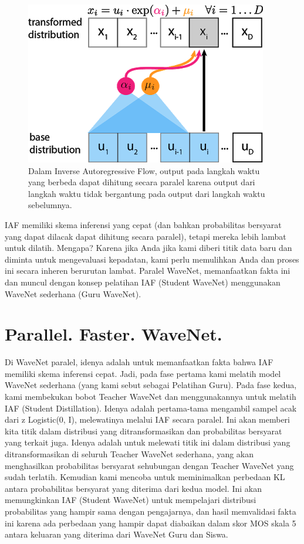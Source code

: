 \begin{figure}[H]
        \centerline{\includegraphics[scale=.5]{figures/rumus13}}
        \caption{Dalam Inverse Autoregressive Flow, output pada langkah waktu yang berbeda dapat dihitung secara paralel karena output dari langkah waktu tidak bergantung pada output dari langkah waktu sebelumnya.}
		\label{rumus13}
\end{figure}
IAF memiliki skema inferensi yang cepat (dan bahkan probabilitas bersyarat yang dapat dilacak dapat dihitung secara paralel), tetapi mereka lebih lambat untuk dilatih. Mengapa? Karena jika Anda jika kami diberi titik data baru dan diminta untuk mengevaluasi kepadatan, kami perlu memulihkan Anda dan proses ini secara inheren berurutan lambat. Paralel WaveNet, memanfaatkan fakta ini dan muncul dengan konsep pelatihan IAF (Student WaveNet) menggunakan WaveNet sederhana (Guru WaveNet).

\section{Parallel. Faster. WaveNet.}
Di WaveNet paralel, idenya adalah untuk memanfaatkan fakta bahwa IAF memiliki skema inferensi cepat. Jadi, pada fase pertama kami melatih model WaveNet sederhana (yang kami sebut sebagai Pelatihan Guru). Pada fase kedua, kami membekukan bobot Teacher WaveNet dan menggunakannya untuk melatih IAF (Student Distillation). Idenya adalah pertama-tama mengambil sampel acak dari z Logistic(0, I), melewatinya melalui IAF secara paralel. Ini akan memberi kita titik dalam distribusi yang ditransformasikan dan probabilitas bersyarat yang terkait juga. Idenya adalah untuk melewati titik ini dalam distribusi yang ditransformasikan di seluruh Teacher WaveNet sederhana, yang akan menghasilkan probabilitas bersyarat sehubungan dengan Teacher WaveNet yang sudah terlatih. Kemudian kami mencoba untuk meminimalkan perbedaan KL antara probabilitas bersyarat yang diterima dari kedua model. Ini akan memungkinkan IAF (Student WaveNet) untuk mempelajari distribusi probabilitas yang hampir sama dengan pengajarnya, dan hasil memvalidasi fakta ini karena ada perbedaan yang hampir dapat diabaikan dalam skor MOS skala 5 antara keluaran yang diterima dari WaveNet Guru dan Siswa.

